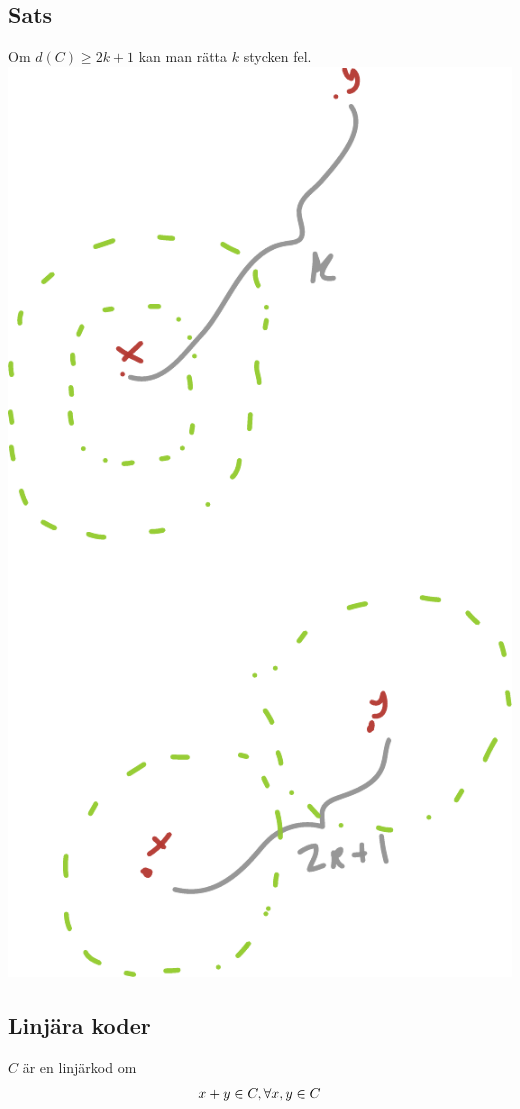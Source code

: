 \documentclass{article}
\begin{document}
\subsection{Sats}
Om $d(C)\ge 2k+1$ kan man rätta $k$ stycken fel.\\
\includegraphics[scale=0.5]{img/img2.pdf}

\subsection{Linjära koder}
$C$ är en linjärkod om
$$ x+y\in C, \forall x,y\in C $$
\end{document}
